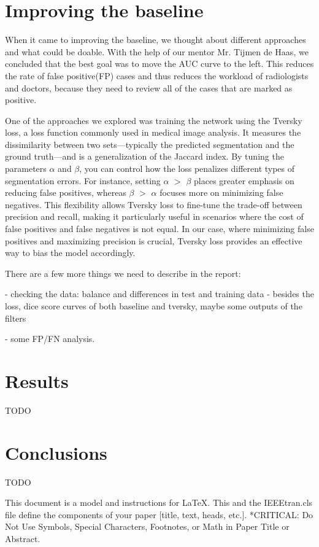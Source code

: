 \documentclass[conference]{IEEEtran}
\begin{document}
\section{Improving the baseline}
When it came to improving the baseline, we thought about different approaches and what could be doable. With the help of our mentor Mr. Tijmen de Haas, we concluded that the best goal was to move the AUC curve to the left. This reduces the rate of false positive(FP) cases and thus reduces the workload of radiologists and doctors, because they need to review all of the cases that are marked as positive.

One of the approaches we explored was training the network using the Tversky loss, a loss function commonly used in medical image analysis. It measures the dissimilarity between two sets—typically the predicted segmentation and the ground truth—and is a generalization of the Jaccard index.\cite{b3} By tuning the parameters $\alpha$ and $\beta$, you can control how the loss penalizes different types of segmentation errors. For instance, setting $\alpha$ $>$ $\beta$ places greater emphasis on reducing false positives, whereas $\beta$ $>$ $\alpha$ focuses more on minimizing false negatives. This flexibility allows Tversky loss to fine-tune the trade-off between precision and recall, making it particularly useful in scenarios where the cost of false positives and false negatives is not equal. In our case, where minimizing false positives and maximizing precision is crucial, Tversky loss provides an effective way to bias the model accordingly.

There are a few more things we need to describe in the report: 

- checking the data: balance and differences in test and training data
- besides the loss, dice score curves of both baseline and tversky, maybe some outputs of the filters

- some FP/FN analysis.


\section{Results}
TODO
\section{Conclusions}
TODO

This document is a model and instructions for \LaTeX.
This and the IEEEtran.cls file define the components of your paper [title, text, heads, etc.]. *CRITICAL: Do Not Use Symbols, Special Characters, Footnotes, 
or Math in Paper Title or Abstract.
\end{document}
